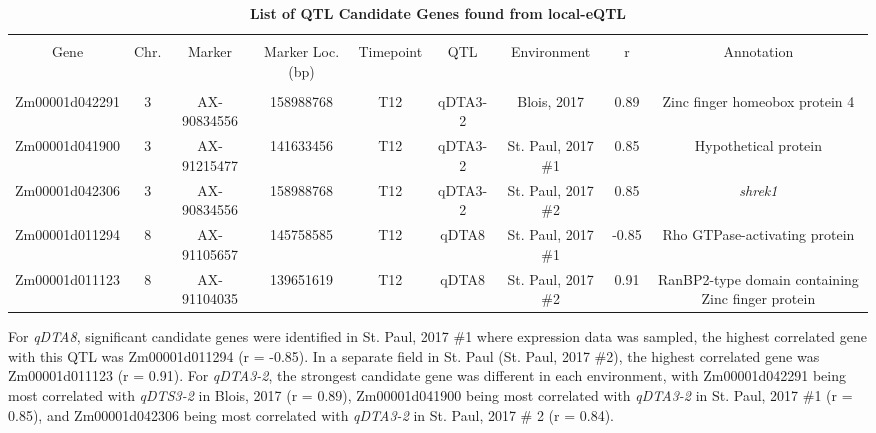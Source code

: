 \documentclass[article,9pt,twocolumn,twoside]{rilabRxiv}
\begin{document}
\begin{table}[!t]
    \centering
    \footnotesize
    \caption{\textbf{List of QTL Candidate Genes found from local-eQTL} \label{tab:candtable}}
    \begin{adjustbox}{max width=\textwidth,center}
    \begin{tabular}{c c c c c c c c c}
    \hline \\
    Gene & Chr. & Marker & Marker Loc. (bp) & Timepoint & QTL & Environment & r & Annotation \\
    \hline \\
    Zm00001d042291 & 3 & AX-90834556 & 158988768 & T12 & qDTA3-2 & Blois, 2017 & 0.89 & Zinc finger homeobox protein 4\\
    Zm00001d041900 & 3 & AX-91215477 & 141633456 & T12 & qDTA3-2 & St. Paul, 2017 \#1 & 0.85 & Hypothetical protein\\
    Zm00001d042306 & 3 & AX-90834556 & 158988768 & T12 & qDTA3-2 & St. Paul, 2017 \#2 & 0.85 & \textit{shrek1}\\
    Zm00001d011294 & 8 & AX-91105657 & 145758585 & T12 & qDTA8 & St. Paul, 2017 \#1 & -0.85 & Rho GTPase-activating protein \\
    Zm00001d011123 & 8 & AX-91104035 & 139651619 & T12 & qDTA8 & St. Paul, 2017 \#2 & 0.91 & RanBP2-type domain containing Zinc finger protein\\
    \hline
    \end{tabular}
    \end{adjustbox}
\end{table}

For \emph{qDTA8}, significant candidate genes were identified in St. Paul, 2017 \#1 where expression data was sampled, the highest correlated gene with this QTL was Zm00001d011294 (r = -0.85).
In a separate field in St. Paul (St. Paul, 2017 \#2), the highest correlated gene was Zm00001d011123 (r = 0.91). 
For \emph{qDTA3-2}, the strongest candidate gene was different in each environment, with Zm00001d042291 being most correlated with \emph{qDTS3-2} in Blois, 2017 (r = 0.89), Zm00001d041900 being most correlated with \emph{qDTA3-2} in St. Paul, 2017 \#1 (r = 0.85), and Zm00001d042306 being most correlated with \emph{qDTA3-2} in St. Paul, 2017 \# 2 (r = 0.84).
\par
\end{document}

